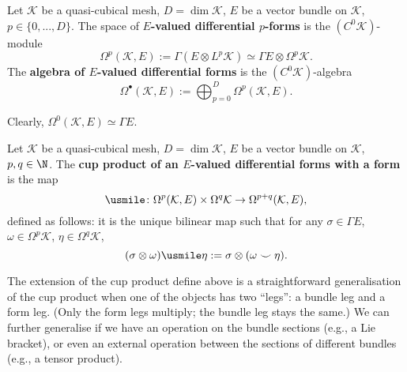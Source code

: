\begin{definition}
  Let
    $\mathcal{K}$ be a quasi-cubical mesh,
    $D = \dim \mathcal{K}$,
    $E$ be a vector bundle on $\mathcal{K}$,
    $p \in \{0, ..., D\}$.
  The space of \textbf{$E$-valued differential $p$-forms} is the
  $(C^0 \mathcal{K})$-module
  \begin{equation}
    \Omega^{p}(\mathcal{K}, E)
    := \Gamma(E \otimes L^p \mathcal{K})
    \simeq \Gamma E \otimes \Omega^p \mathcal{K}.
  \end{equation}
  The \textbf{algebra of $E$-valued differential forms} is the
  $(C^0 \mathcal{K})$-algebra
  \begin{equation}
    \Omega^\bullet(\mathcal{K}, E)
    := \bigoplus_{p = 0}^D \Omega^p(\mathcal{K}, E).
  \end{equation}
\end{definition}
\begin{remark}
  Clearly, $\Omega^{0}(\mathcal{K}, E) \simeq \Gamma E$.
\end{remark}
\begin{definition}
  Let
    $\mathcal{K}$ be a quasi-cubical mesh,
    $D = \dim \mathcal{K}$,
    $E$ be a vector bundle on $\mathcal{K}$,
    $p, q \in \N$.
  The \textbf{cup product of an $E$-valued differential forms with a form}
  is the map
  \begin{equation}
    \usmile
    \colon \Omega^p(\mathcal{K}, E) \times \Omega^q \mathcal{K}
    \to \Omega^{p + q}(\mathcal{K}, E),
  \end{equation}
  defined as follows: it is the unique bilinear map such that for any
  $\sigma \in \Gamma E$,
  $\omega \in \Omega^p \mathcal{K}$,
  $\eta \in \Omega^q \mathcal{K}$,
  \begin{equation}
    (\sigma \otimes \omega) \usmile \eta :=
    \sigma \otimes (\omega \smile \eta).
  \end{equation}
\end{definition}
\begin{remark}
  The extension of the cup product define above is a straightforward
  generalisation of the cup product when one of the objects has two ``legs'':
  a bundle leg and a form leg.
  (Only the form legs multiply; the bundle leg stays the same.)
  We can further generalise if we have an operation on the bundle sections
  (e.g., a Lie bracket),
  or even an external operation between the sections of different bundles
  (e.g., a tensor product). 
\end{remark}
